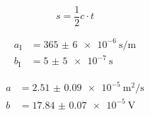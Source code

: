 \begin{equation}
    s = \frac{1}{2} c \cdot t
    \label{eq:strecke}
\end{equation}

\begin{align}
    a_\text{I} &= \SI{365(6)e-6}{\second\per\meter}\\
    b_\text{I} &= \SI{5(5)e-7}{\second}
\end{align}

\begin{align*}
    a &= \SI{2.51(9)e-5}{\meter\squared\per\second} \\
    b &= \SI{17.84(7)e-5}{\volt}
\end{align*}

